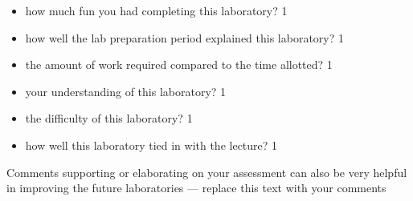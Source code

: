 \documentclass[epsfig,12pt]{article}
\begin{document}
\bigskip
\begin{itemize}
\item
	how much fun you had completing this laboratory?
	\hfill 1

\item
	how well the lab preparation period explained this laboratory?
	\hfill 1

\item
	the amount of work required compared to the time allotted?
	\hfill 1

\item
	your understanding of this laboratory?
	\hfill 1

\item
	the difficulty of this laboratory?
	\hfill 1

\item
	how well this laboratory tied in with the lecture?
	\hfill 1
\end{itemize}

\bigskip\noindent
	Comments supporting or elaborating on your assessment can also be very helpful in improving the future laboratories
	--- replace this text with your comments
\end{document}
